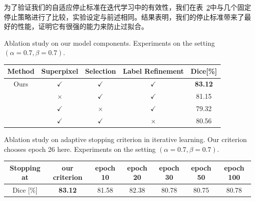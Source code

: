 为了验证我们的自适应停止标准在迭代学习中的有效性，我们在表~\ref{tab:ablate_stop}中与几个固定停止策略进行了比较，实验设定与前述相同。结果表明，我们的停止标准带来了最好的性能，证明它有很强的能力来防止过拟合。

    \begin{table}[t!]
        {Ablation study on our model components. Experiments on the setting $(\alpha=0.7, \beta=0.7)$.}
        \label{tab:ablate}\small
        \centering
            \setlength{\tabcolsep}{8pt}
            \begin{tabular}[t]{c|c|c|c|c}
                \toprule
                Method  & Superpixel    & Selection    & Label Refinement    & Dice[\%]  \\ \midrule
                Ours    & $\checkmark$  & $\checkmark$  & $\checkmark$  &  \textbf{83.12} \\   
                        & $\times$  & $\checkmark$  & $\checkmark$      &  81.15 \\                 
                        & $\checkmark$  & $\times$  & $\checkmark$      &  79.32 \\
                        & $\checkmark$  & $\checkmark$  & $\times$      &  80.56 \\
                \bottomrule
            \end{tabular}
    \end{table}

    \begin{table}[t]
        \centering
        {Ablation study on adaptive stopping criterion in iterative learning. Our criterion chooses epoch 26 here. Experiments on the setting $(\alpha=0.7, \beta=0.7)$.}
        \label{tab:ablate_stop}
        \setlength{\tabcolsep}{6pt}
            \begin{tabular}[t]{c|c|c|c|c|c|c}
                \toprule
                Stopping at & our criterion     & epoch 10 & epoch 20 & epoch 30 & epoch 50 & epoch 100   \\ \midrule  %
                Dice [\%]        & \textbf{83.12}   & 81.58 & 82.38 & 80.78    & 80.75    & 80.78       \\          %
                \bottomrule 
            \end{tabular}
    \end{table}

